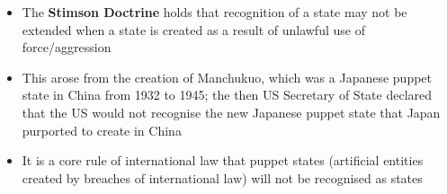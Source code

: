 \begin{itemize}
    \begin{itemize}
        \item The \textbf{Stimson Doctrine} holds that recognition of a state may not be extended when a state is created as a result of unlawful use of force/aggression
        \item This arose from the creation of Manchukuo, which was a Japanese puppet state in China from 1932 to 1945; the then US Secretary of State declared that the US would not recognise the new Japanese puppet state that Japan purported to create in China
        \item It is a core rule of international law that puppet states (artificial entities created by breaches of international law) will not be recognised as states
    \end{itemize}
\end{itemize}

